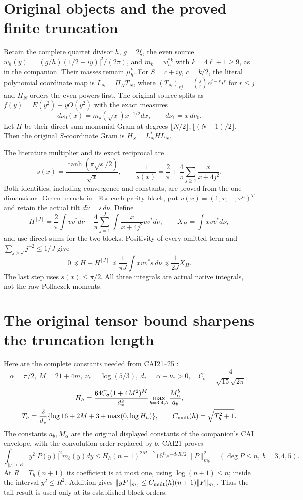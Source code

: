 \documentclass[11pt]{article}
\begin{document}
\section{Original objects and the proved finite truncation}
Retain the complete quartet divisor $h$, $g=2\xi$, the even source
$w_h(y)=|(g/h)(1/2+iy)|^2/(2\pi)$, and $m_k=w_h^{*k}$ with
$k=4\ell+1\ge9$, as in the companion. Their masses remain
$\mu_h^k$. For $S=c+iy$, $c=k/2$, the literal polynomial coordinate
map is $L_N=\Pi_NT_N$, where
$(T_N)_{rj}=\binom jr c^{j-r}i^r$ for $r\le j$ and $\Pi_N$ orders
the even powers first. The original source splits as
$f(y)=E(y^2)+yO(y^2)$ with the exact measures
\[
 d\nu_0(x)=m_k(\sqrt x)x^{-1/2}dx,\qquad d\nu_1=x\,d\nu_0.
\]
Let $H$ be their direct-sum monomial Gram at degrees
$\lfloor N/2\rfloor,\lfloor(N-1)/2\rfloor$. Then the original
$S$-coordinate Gram is $H_S=L_N^*HL_N$.

The literature multiplier and its exact reciprocal are
\[
 s(x)=\frac{\tanh(\pi\sqrt x/2)}{\sqrt x},\qquad
 \frac1{s(x)}=\frac2\pi+\frac4\pi\sum_{j\ge1}\frac{x}{x+4j^2}.
\]
Both identities, including convergence and constants, are proved from
the one-dimensional Green kernels in \cite{nativecut:PP}. For each parity block,
put $v(x)=(1,x,\ldots,x^n)^T$ and retain the actual tilt
$d\widetilde\nu=s\,d\nu$. Define
\[
 H^{[J]}=\frac2\pi\int vv^*d\widetilde\nu
 +\frac4\pi\sum_{j=1}^J\int\frac{x}{x+4j^2}vv^*d\widetilde\nu,
 \qquad X_H=\int xvv^*d\nu,
\]
and use direct sums for the two blocks. Positivity of every omitted
term and $\sum_{j>J}j^{-2}\le1/J$ give
\begin{equation}\tag{TR1}\label{nativecut:eq:tail}
 0\preceq H-H^{[J]}\preceq\frac1{\pi J}\int xvv^*s\,d\nu
                                  \preceq\frac1{2J}X_H.
\end{equation}
The last step uses $s(x)\le\pi/2$. All three integrals are actual
native integrals, not the raw Pollaczek moments.

\section{The original tensor bound sharpens the truncation length}
Here are the complete constants needed from CAI21--25 \cite{nativecut:CAI}:
\[
 \alpha=\pi/2,\ M=21+4m,\ \nu_*=\log(5/3),\ d_* =\alpha-\nu_*>0,
 \quad C_\sigma=\frac4{\sqrt{15}\sqrt{2\pi}},
\]
\[
 \begin{gathered}
 H_h=\frac{64C_\sigma(1+4M^2)^M}{d_*^2}
             \max_{b=3,4,5}\frac{M_\alpha^b}{a_b},\\
 T_h=\frac2{d_*}\{\log16+2M+3+\max(0,\log H_h)\},\qquad
 C_{\rm mult}(h)=\sqrt{T_h^2+1}.
 \end{gathered}
\]
The constants $a_b,M_\alpha$ are the original displayed constants
of the companion's CAI envelope, with the convolution order replaced
by $b$. CAI21 proves
\[
 \int_{|y|>R}y^2|P(y)|^2m_b(y)dy
 \le H_h(n+1)^{2M+2}16^ne^{-d_*R/2}\|P\|_{m_b}^2
 \quad(\deg P\le n,\ b=3,4,5).
\]
At $R=T_h(n+1)$ its coefficient is at most one, using
$\log(n+1)\le n$; inside the interval $y^2\le R^2$. Addition gives
$\|yP\|_{m_b}\le C_{\rm mult}(h)(n+1)\|P\|_{m_b}$.
Thus the tail result is used only at its established block orders.
\end{document}
